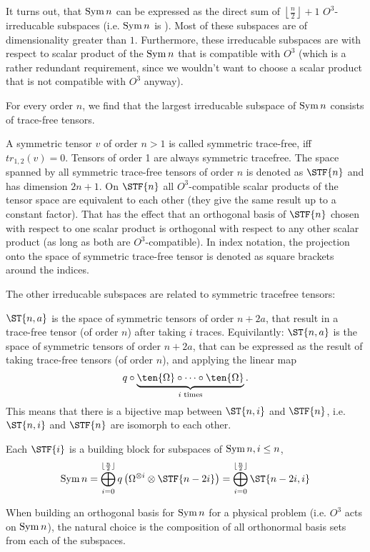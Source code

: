 \begin{example}
	It turns out, that $\operatorname{Sym}{n}$ can be expressed as the direct sum of $\left\lfloor\frac{n}{2}\right\rfloor+1$ $O^3$-irreducable subspaces (i.e. $\operatorname{Sym}{n}$ is ). Most of these subspaces are of dimensionality greater than $1$. Furthermore, these irreducable subspaces are  with respect to  scalar product of the $\operatorname{Sym}{n}$ that is compatible with $O^3$ (which is a rather redundant requirement, since we wouldn't want to choose a scalar product that is not compatible with $O^3$ anyway).
	
	For every order $n$, we find that the largest irreducable subspace of $\operatorname{Sym}{n}$ consists of trace-free tensors.
	\begin{definition}
		A symmetric tensor $v$ of order $n>1$ is called symmetric trace-free, iff $tr_{1,2}(v)=0$. Tensors of order 1 are always symmetric tracefree.
		The space spanned by all symmetric trace-free tensors of order $n$ is denoted as $\STF{n}$ and has dimension $2n+1$. On $\STF{n}$ all $O^3$-compatible scalar products of the tensor space are equivalent to each other (they give the same result up to a constant factor). That has the effect that an orthogonal basis of $\STF{n}$ chosen with respect to one scalar product is orthogonal with respect to any other scalar product (as long as both are $O^3$-compatible). In index notation, the projection onto the space of symmetric trace-free tensor is denoted as square brackets around the indices.
	\end{definition}
	The other irreducable subspaces are related to symmetric tracefree tensors:
	\begin{definition}
		$\ST{n,a}$ is the space of symmetric tensors of order $n+2a$, that result in a trace-free tensor (of order $n$) after taking $i$ traces. Equivilantly: $\ST{n,a}$ is the space of symmetric tensors of order $n+2a$, that can be expressed as the result of taking trace-free tensors (of order $n$), and applying the linear map
		\[q\circ \underbrace{\ten{\Omega}\circ \cdots \circ \ten{\Omega}}_{i \text{ times}}.\]
		This means that there is a bijective map between $\ST{n,i}$ and $\STF{n}$, i.e. $\ST{n,i}$ and $\STF{n}$ are isomorph to each other.
	\end{definition}
	
	\begin{lemma}
		Each $\STF{i}$ is a building block for subspaces of $\operatorname{Sym}{n}, i\leq n$,
		\[\Sym{n} = \bigoplus_{i=0}^{\lfloor\frac{n}{2}\rfloor} q\left(\Omega^{\otimes i}\otimes \STF{n-2i}\right)=\bigoplus_{i=0}^{\lfloor\frac{n}{2}\rfloor}\ST{n-2i,i}\]
		
	\end{lemma}
	
	When building an orthogonal basis for $\operatorname{Sym}{n}$ for a physical problem (i.e. $O^3$ acts on $\operatorname{Sym}{n}$), the natural choice is the composition of all orthonormal basis sets from each of the subspaces. 
	
\end{example}

